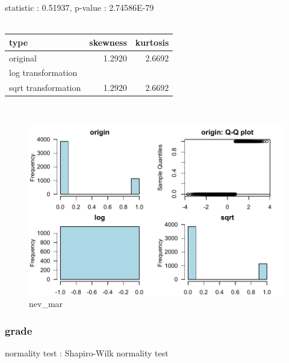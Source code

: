 \documentclass{book}\usepackage[]{graphicx}\usepackage[]{color}
\begin{document}
\noindent statistic : 0.51937,  p-value : 2.74586E-79\\
\\%
\begin{tabular}{lrr}
  \toprule
type & skewness & kurtosis \\ 
  \midrule
original & 1.2920 & 2.6692 \\ 
  log transformation &  &  \\ 
  sqrt transformation & 1.2920 & 2.6692 \\ 
   \bottomrule
\end{tabular}
\\
\begin{figure}[!ht]
\centering
\includegraphics[width=1.0\textwidth]{figure/norm7.pdf}
\caption{nev\_mar}
\end{figure}
\clearpage
\subsubsection{ grade }

normality test : Shapiro-Wilk normality test
\end{document}
